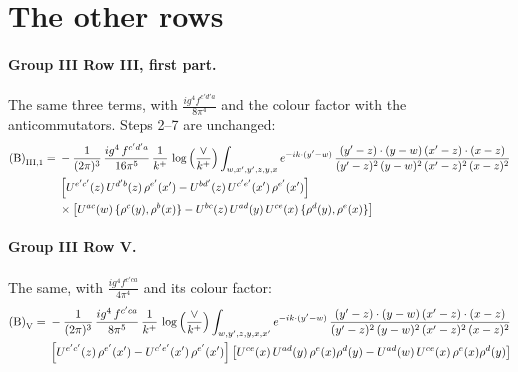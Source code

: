 \documentclass[10pt]{article}
\numberwithin{equation}{section}
\begin{document}
\section{The other rows}
\paragraph{Group III Row III, first part.} The same three terms, with $\frac{ig^{4}f^{c'd'a}}{8\pi^{4}}$ and the colour factor with the anticommutators. Steps 2--7 are unchanged:
\begin{align}
\text{(B)}_{\rm III,1}={}&-\frac{1}{(2\pi)^{3}}\, \frac{ig^{4}\,f^{c'd'a}}{16\pi^{5}}\, \frac{1}{k^{+}}\,\log{\left(\frac{\vee}{k^{+}}\right)}\int_{w,x',y',z,y,x} e^{-ik\cdot (y'-w)}\,\frac{(y'-z)\cdot (y-w)\,(x'-z)\cdot (x-z)}{(y'-z)^{2}\,(y-w)^{2}\,(x'-z)^{2}\,(x-z)^{2}}\notag \\
& \left[U^{e'c'}(z)\,U^{d'b}(z)\,\rho^{e'}(x')-U^{bd'}(z)\,U^{c'e'}(x')\,\rho^{e'}(x')\right]\notag \\
& \times\left[U^{ac}(w)\, \{\rho^{c}(y),\rho^{b}(x)\}-U^{bc}(z)\,U^{ad}(y)\,U^{ce}(x)\,\{\rho^{d}(y),\rho^{e}(x)\}\right] \label{eq:BIII,1}
\end{align}
\paragraph{Group III Row V.} The same, with $\frac{ig^{4}f^{c'ca}}{4\pi^{4}}$ and its colour factor:
\begin{align}
\text{(B)}_{\rm V}={}&-\frac{1}{(2\pi)^{3}}\, \frac{ig^{4}\,f^{c'ca}}{8\pi^{5}}\, \frac{1}{k^{+}}\,\log{\left(\frac{\vee}{k^{+}}\right)}\int_{w,y',z,y,x,x'} e^{-ik\cdot (y'-w)}\,\frac{(y'-z)\cdot (y-w)\,(x'-z)\cdot (x-z)}{(y'-z)^{2}\,(y-w)^{2}\,(x'-z)^{2}\,(x-z)^{2}}\notag \\
& \left[U^{e'c'}(z)\,\rho^{e'}(x')-U^{c'e'}(x')\,\rho^{e'}(x')\right]\left[U^{ce}(x)\,U^{ad}(y)\,\rho^{e}(x)\rho^{d}(y)-U^{ad}(w)\,U^{ce}(x)\,\rho^{e}(x)\rho^{d}(y)\right] \label{eq:BV}
\end{align}
\end{document}
